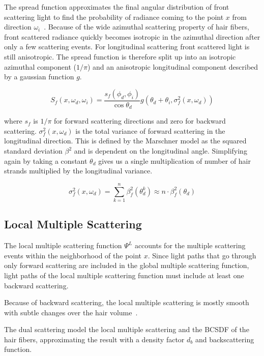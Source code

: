 The spread function approximates the final angular distribution of front scattering light to find the probability of radiance coming to the point $x$ from direction $\omega_i$~\cite{zinke}. Because of the wide azimuthal scattering property of hair fibers, front scattered radiance quickly becomes isotropic in the azimuthal direction after only a few scattering events. For longitudinal scattering front scattered light is still anisotropic. The spread function is therefore split up into an isotropic azimuthal component ($1/\pi$) and an anisotropic longitudinal component described by a gaussian function $g$.

\begin{equation}
\label{dualscattering_Sf}
S_f(x, \omega_d, \omega_i) = \frac{s_f(\phi_d, \phi_i)}{\cos \theta_d} g(\theta_d + \theta_i, \sigma_f^2(x, \omega_d))
\end{equation}

where $s_f$ is $1/\pi$ for forward scattering directions and zero for backward scattering. $\sigma_f^2(x, \omega_d)$ is the total variance of forward scattering in the longitudinal direction. This is defined by the Marschner model as the squared standard deviation $\beta^2$ and is dependent on the longitudinal angle. Simplifying again by taking a constant $\theta_d$ gives us a single multiplication of number of hair strands multiplied by the longitudinal variance.

\begin{equation}
\sigma_f^2(x, \omega_d) = \sum_{k=1}^{n} \beta_f^2(\theta_d^k) \approx n \cdot \beta_f^2(\theta_d)
\end{equation}


\subsection{Local Multiple Scattering}

The local multiple scattering function $\Psi^L$ accounts for the multiple scattering events within the neighborhood of the point $x$. Since light paths that go through only forward scattering are included in the global multiple scattering function, light paths of the local multiple scattering function must include at least one backward scattering.

Because of backward scattering, the local multiple scattering is mostly smooth with subtle changes over the hair volume~\cite{zinke}.

The dual scattering model the local multiple scattering and the BCSDF of the hair fibers, approximating the result with a density factor $d_b$ and backscattering function.

